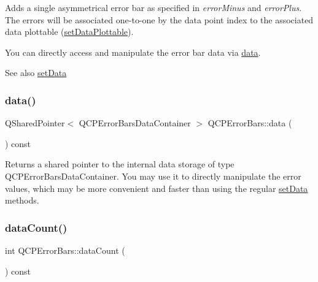Adds a single asymmetrical error bar as specified in {\itshape error\+Minus} and {\itshape error\+Plus}. The errors will be associated one-\/to-\/one by the data point index to the associated data plottable (\hyperlink{class_q_c_p_error_bars_aabb42a964cfbf780cd1c79850c7cd989}{set\+Data\+Plottable}).

You can directly access and manipulate the error bar data via \hyperlink{class_q_c_p_error_bars_aeebd1b14f4c3573565efafd514988813}{data}.

\begin{DoxySeeAlso}{See also}
\hyperlink{class_q_c_p_error_bars_a92b1980003255f5f7c05407a4d92aabc}{set\+Data} 
\end{DoxySeeAlso}
\mbox{\label{class_q_c_p_error_bars_aeebd1b14f4c3573565efafd514988813}} 
\subsubsection{\texorpdfstring{data()}{data()}}
{\footnotesize\ttfamily Q\+Shared\+Pointer$<$ Q\+C\+P\+Error\+Bars\+Data\+Container $>$ Q\+C\+P\+Error\+Bars\+::data (\begin{DoxyParamCaption}{ }\end{DoxyParamCaption}) const\hspace{0.3cm}{\ttfamily [inline]}}

Returns a shared pointer to the internal data storage of type Q\+C\+P\+Error\+Bars\+Data\+Container. You may use it to directly manipulate the error values, which may be more convenient and faster than using the regular \hyperlink{class_q_c_p_error_bars_a92b1980003255f5f7c05407a4d92aabc}{set\+Data} methods. \mbox{\label{class_q_c_p_error_bars_ad8811b034a17cb4ef898cbcc8da29bd2}} 
\subsubsection{\texorpdfstring{data\+Count()}{dataCount()}}
{\footnotesize\ttfamily int Q\+C\+P\+Error\+Bars\+::data\+Count (\begin{DoxyParamCaption}{ }\end{DoxyParamCaption}) const\hspace{0.3cm}{\ttfamily [virtual]}}

